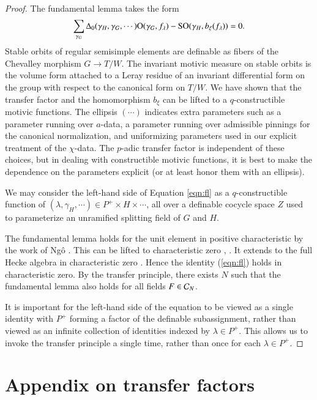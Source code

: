 \begin{proof}
  The fundamental lemma takes the form
\begin{equation}\label{eqn:fl}
\sum_{\gamma_G}\Delta_0(\gamma_H,\gamma_G,\cdots)
{\operatorname{O}}(\gamma_G,f_\lambda) - {\operatorname{SO}}(\gamma_H,b_\xi(f_\lambda)) = 0.
\end{equation}
Stable orbits of regular semisimple elements are definable as fibers
of the Chevalley morphism $G\to T/W$.  The invariant motivic measure
on stable orbits is the volume form attached to a Leray residue of an
invariant differential form on the group with respect to the canonical
form on $T/W$.  We have shown that the transfer factor and the
homomorphism $b_\xi$ can be lifted to a $q$-constructible motivic
functions.  The ellipsis $(\cdots)$ indicates extra parameters such as
a parameter running over $a$-data, a parameter running over admissible
pinnings for the canonical normalization, and uniformizing parameters
used in our explicit treatment of the $\chi$-data.  The $p$-adic
transfer factor is independent of these choices, but in dealing with
constructible motivic functions, it is best to make the dependence on
the parameters explicit (or at least honor them with an ellipsis).

We may consider the left-hand side of Equation \ref{eqn:fl} as a
$q$-constructible function of $(\lambda,\gamma_H,\cdots)\in P^+\times
H\times\cdots$, all over a definable cocycle space $Z$ used to
parameterize an unramified splitting field of $G$ and $H$.

The fundamental lemma holds for the unit element in positive
characteristic by the work of Ng\^o \cite{ngo2010lemme}.  This can be
lifted to characteristic zero \cite{cluckers2011transfer},
\cite{waldspurger2006endoscopie}.  It extends to the full Hecke
algebra in characteristic zero \cite{hales1995fundamental}.  Hence the
identity (\ref{eqn:fl}) holds in characteristic zero.  By the transfer
principle, there exists $N$ such that the fundamental lemma also holds
for all fields $F\in\mathcal C_N$.

It is important for the left-hand side of the equation to be viewed as
a single identity with $P^+$ forming a factor of the definable
subassignment, rather than viewed as an infinite collection of
identities indexed by $\lambda\in P^+$.  This allows us to invoke the
transfer principle a single time, rather than once for each
$\lambda\in P^+$.
\end{proof}

\section{Appendix on transfer factors}

